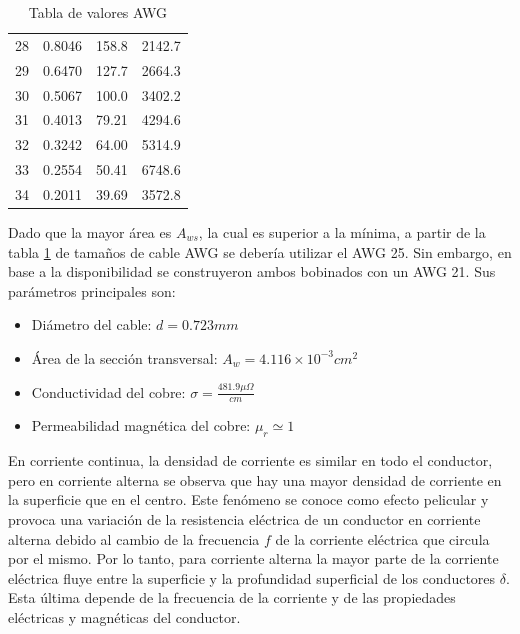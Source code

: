 \begin{table}[H]
\begin{tabular}{cccc}
        28         & 0.8046                & 158.8     & 2142.7               \\
        29         & 0.6470                & 127.7     & 2664.3               \\
        30         & 0.5067                & 100.0     & 3402.2               \\
        31         & 0.4013                & 79.21     & 4294.6               \\
        32         & 0.3242                & 64.00     & 5314.9               \\
        33         & 0.2554                & 50.41     & 6748.6               \\
        34         & 0.2011                & 39.69     & 3572.8               \\ \hline
    \end{tabular}
    \caption{Tabla de valores AWG}
    \label{table:awg}
\end{table}

Dado que la mayor área es $A_{ws}$, la cual es superior a la mínima, a partir de la tabla \ref{table:awg} de tamaños de cable AWG se debería utilizar el AWG 25.
Sin embargo, en base a la disponibilidad se construyeron ambos bobinados con un AWG 21. 
Sus parámetros principales son:

\begin{itemize}
    \item Diámetro del cable: $d=0.723mm$
    \item Área de la sección transversal: $A_{w}=4.116\times10^{-3}cm^2$
    \item Conductividad del cobre: $\sigma=\frac{481.9\mu\Omega}{cm}$
    \item Permeabilidad magnética del cobre: $\mu_r\simeq1$
\end{itemize}

En corriente continua, la densidad de corriente es similar en todo el conductor, pero en corriente alterna se observa que hay una mayor densidad de corriente en la superficie que en el centro. 
Este fenómeno se conoce como efecto pelicular y provoca una variación de la resistencia eléctrica de un conductor en corriente alterna debido al cambio de la frecuencia $f$ de la corriente eléctrica que circula por el mismo.
Por lo tanto, para corriente alterna la mayor parte de la corriente eléctrica fluye entre la superficie y la profundidad superficial de los conductores $\delta$.
Esta última depende de la frecuencia de la corriente y de las propiedades eléctricas y magnéticas del conductor.

